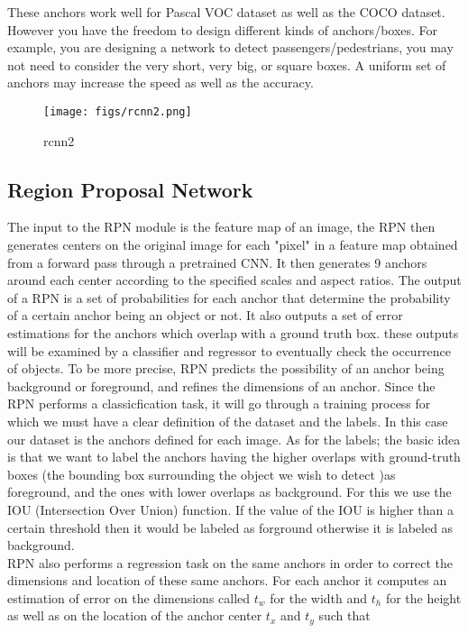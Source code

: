These anchors work well for Pascal VOC dataset as well as the COCO dataset. However you have the freedom to design different kinds of anchors/boxes. For example, you are designing a network to detect passengers/pedestrians, you may not need to consider the very short, very big, or square boxes. A uniform set of anchors may increase the speed as well as the accuracy.

\begin{figure}[!htpb]
	\centering
	\texttt{[image: figs/rcnn2.png]}
	\caption{rcnn2}\label{fig:rcnn2}
\end{figure}

\subsection{Region Proposal Network}
The input to the RPN module is the feature map of an image, the RPN then generates centers on the original image for each "pixel" in a feature map obtained from a forward pass through a pretrained CNN. It then generates 9 anchors around each center according to the specified scales and aspect ratios.
The output of a RPN is a set of probabilities  for each anchor that determine the probability of a certain anchor being an object or not. It also outputs a set of error estimations for the anchors which overlap with a ground truth box. these outputs will be examined by a classifier and regressor to eventually check the occurrence of objects. To be more precise, RPN predicts the possibility of an anchor being background or foreground, and refines the dimensions of an anchor.
Since the RPN performs a classicfication task, it will go through a training process for which we must have a clear definition of the dataset and the labels. In this case our dataset is the anchors defined for each image. As for the labels; the basic idea  is that we want to label the anchors having the higher overlaps with ground-truth boxes (the bounding box surrounding the object we wish to detect )as foreground, and the ones with lower overlaps as background. For this we use the IOU (Intersection Over Union) function. If the value of the IOU is higher than a certain threshold then it would be labeled as forground otherwise it is labeled as background. \\

RPN also performs a regression task on the same anchors in order to correct the dimensions and location of these same anchors. For each anchor it computes an estimation of error on the dimensions called $t_{w}$ for the width and $t_{h}$ for the height as well as on the location of the anchor center $t_{x}$ and $t_{y}$ such that

